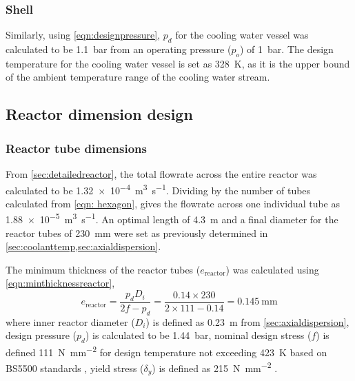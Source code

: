 \subsubsection{Shell}
Similarly, using \cref{eqn:designpressure}, $p_d$ for the cooling water vessel was calculated to be \SI{1.1}{\bar} from an operating pressure ($p_o$) of \SI{1}{\bar}. The design temperature for the cooling water vessel is set as \SI{328}{\K}, as it is the upper bound of the ambient temperature range of the cooling water stream. 

\subsection{Reactor dimension design}
\label{sec:reactordimensions}

\subsubsection{Reactor tube dimensions}
\label{sec:reactortube}
From \cref{sec:detailedreactor}, the total flowrate across the entire reactor was calculated to be \SI{1.32e-4}{\cubic\m\per\s}. Dividing by the number of tubes calculated from \cref{eqn: hexagon}, gives the flowrate across one individual tube as \SI{1.88e-5}{\cubic\m\per\s}. An optimal length of \SI{4.3}{\metre} and a final diameter for the reactor tubes of \SI{230}{\milli \metre} were set as previously determined in \cref{sec:coolanttemp,sec:axialdispersion}. 

The minimum thickness of the reactor tubes ($e_\mathrm{reactor}$) was calculated using \cref{eqn:minthicknessreactor},
\begin{equation}
    e_\mathrm{reactor} = \frac{p_dD_i}{2f-p_d} = \frac{0.14 \times 230}{2 \times 111 - 0.14} = \SI{0.145}{\mm}
    \label{eqn:minthicknessreactor}
\end{equation}
where inner reactor diameter ($D_i$) is defined as \SI{0.23}{\metre} from \cref{sec:axialdispersion}, design pressure ($p_d$) is calculated to be \SI{1.44}{\bar}, nominal design stress ($f$) is defined \SI{111}{\N\per\square\mm} for design temperature not exceeding \SI{423}{\K} based on BS5500 standards , yield stress ($\delta_y$) is defined as \SI{215}{\N\per\square\mm} \cite{noauthor_unfired_nodate}.


